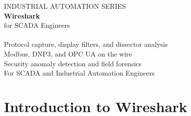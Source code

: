 \documentclass[12pt,twoside,openright]{memoir}
\begin{document}
\begin{titlingpage}
\pagecolor{wsnavy}
\color{white}
\vspace*{2cm}
\begin{center}
  {\fontsize{11}{13}\sffamily\color{wslight}\MakeUppercase{Industrial Automation Series}}\\[0.8cm]
  {\fontsize{44}{50}\bfseries\sffamily Wireshark}\\[0.3cm]
  {\fontsize{28}{32}\sffamily\color{wscyan!80} for SCADA Engineers}\\[1.5cm]
\\[1.5cm]
  {\large\sffamily\color{covergray}
    Protocol capture, display filters, and dissector analysis\\[0.3cm]
    Modbus, DNP3, and OPC UA on the wire\\[0.3cm]
    Security anomaly detection and field forensics
  }\\[2cm]
  \vfill
  {\small\sffamily\color{gray} For SCADA and Industrial Automation Engineers}
\end{center}
\end{titlingpage}
\pagecolor{white}\color{black}

\frontmatter
\pagestyle{plain}
\tableofcontents*
\clearpage

\mainmatter
\pagestyle{fancy}

\chapter{Introduction to Wireshark}
\end{document}
